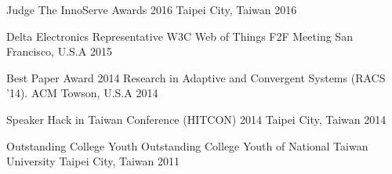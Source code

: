 
\begin{cvhonors}

  \cvhonor
    {Judge} %
    {The InnoServe Awards 2016} %
    {Taipei City, Taiwan} %
    {2016} %

  \cvhonor
    {Delta Electronics Representative} %
    {W3C Web of Things F2F Meeting} %
    {San Francisco, U.S.A} %
    {2015} %

  \cvhonor
    {Best Paper Award} %
    {2014 Research in Adaptive and Convergent Systems (RACS '14). ACM} %
    {Towson, U.S.A} %
    {2014} %

  \cvhonor
    {Speaker} %
    {Hack in Taiwan Conference (HITCON) 2014} %
    {Taipei City, Taiwan} %
    {2014} %

  \cvhonor
    {Outstanding College Youth} %
    {Outstanding College Youth of National Taiwan University} %
    {Taipei City, Taiwan} %
    {2011} %

\end{cvhonors}
